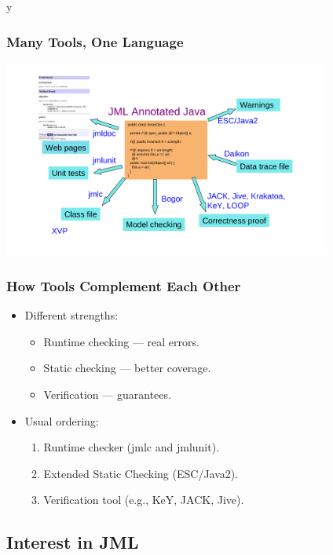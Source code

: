 \if y\MAKEHANDOUTS \documentclass[t,compress,landscape,handout]{beamer}
\begin{document}
\begin{frame}
\frametitle{Many Tools, One Language}
\includegraphics[width=4.25in]{tools-overview}
\end{frame}

\begin{frame}
\frametitle{How Tools Complement Each Other}
\begin{itemize}
\item
Different strengths:
\begin{itemize}
\item
Runtime checking --- real errors.

\item
Static checking --- better coverage.

\item
Verification --- guarantees.
\end{itemize}

\item
Usual ordering:
\begin{enumerate}
\item
Runtime checker (jmlc and jmlunit).

\item
Extended Static Checking (ESC/Java2).

\item
Verification tool (e.g., KeY, JACK, Jive).
\end{enumerate}
\end{itemize}
\end{frame}

\subsection[Interest]{Interest in JML}
\end{document}
